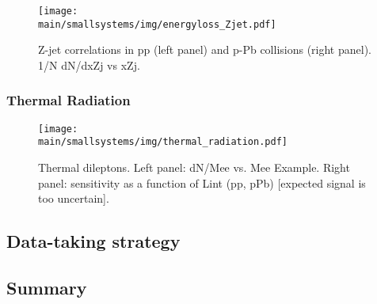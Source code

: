 \documentclass[../report.tex]{subfiles}
\providecommand{\main}{..}
\begin{document}
\begin{figure}[ht]
\centering
\texttt{[image: \\main/smallsystems/img/energyloss\_Zjet.pdf]}
\caption{Z-jet correlations in pp (left panel) and p-Pb collisions (right panel). 1/N dN/dxZj vs xZj.}
\label{fig:smallsystems_energyloss_Zjet}
\end{figure}

\subsubsection{Thermal Radiation}

\begin{figure}[ht]
\centering
\texttt{[image: \\main/smallsystems/img/thermal\_radiation.pdf]}
\caption{Thermal dileptons. Left panel: dN/Mee vs. Mee Example. Right panel: sensitivity as a function of Lint (pp, pPb) [expected signal is too uncertain].}
\label{fig:smallsystems_thermal_radition}
\end{figure}

\subsection{Data-taking strategy}


\subsection{Summary}
\end{document}
